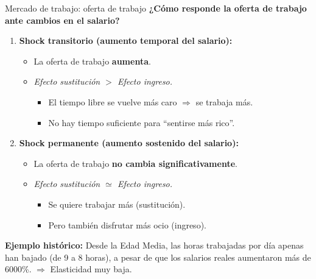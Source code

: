 \documentclass{beamer}
\begin{document}
\begin{frame}{Mercado de trabajo: oferta de trabajo}
\small
\textbf{¿Cómo responde la oferta de trabajo ante cambios en el salario?}
\begin{enumerate}
\item \textbf{Shock transitorio (aumento temporal del salario):}
\begin{itemize}
    \item La oferta de trabajo \textbf{aumenta}.
    \item \textit{Efecto sustitución $>$ Efecto ingreso.}
    \begin{itemize}
        \item El tiempo libre se vuelve más caro $\Rightarrow$ se trabaja más.
        \item No hay tiempo suficiente para “sentirse más rico”.
    \end{itemize}
\end{itemize}

\item \textbf{Shock permanente (aumento sostenido del salario):}
\begin{itemize}
    \item La oferta de trabajo \textbf{no cambia significativamente}.
    \item \textit{Efecto sustitución $\simeq$ Efecto ingreso.}
    \begin{itemize}
        \item Se quiere trabajar más (sustitución).
        \item Pero también disfrutar más ocio (ingreso).
    \end{itemize}
\end{itemize}
\end{enumerate}
\textbf{Ejemplo histórico:}  
Desde la Edad Media, las horas trabajadas por día apenas han bajado (de 9 a 8 horas), a pesar de que los salarios reales aumentaron más de 6000\%. $\Rightarrow$ Elasticidad muy baja.
\end{frame}
\end{document}
